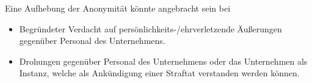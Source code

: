 \noindent
Eine Aufhebung der Anonymität könnte angebracht sein bei

\begin{itemize}
    \itemsep0.5em
    \item Begründeter Verdacht auf persönlichkeits-/ehrverletzende Äußerungen gegenüber Personal des Unternehmens.
    \item Drohungen gegenüber Personal des Unternehmens oder das Unternehmen als Instanz, welche als Ankündigung einer Straftat verstanden werden können.
\end{itemize}
